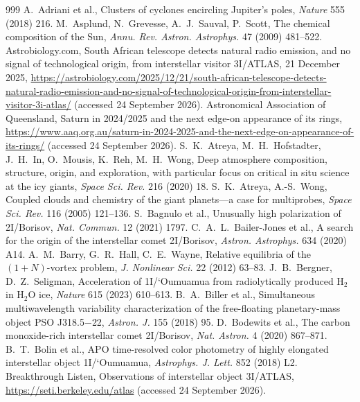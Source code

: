 \documentclass[11pt]{article}
\theoremstyle{definition}\newtheorem{definition}[theorem]{Definition}
\theoremstyle{remark}\newtheorem{remark}[theorem]{Remark}
\begin{document}
\begin{thebibliography}{999}\small\setlength{\itemsep}{0pt}\setlength{\parskip}{0pt}
 A.~Adriani et al., Clusters of cyclones encircling Jupiter's poles, \emph{Nature} 555 (2018) 216.
 M.~Asplund, N.~Grevesse, A.~J.~Sauval, P.~Scott, The chemical composition of the Sun, \emph{Annu. Rev. Astron. Astrophys.} 47 (2009) 481--522.
 Astrobiology.com, South African telescope detects natural radio emission, and no signal of technological origin, from interstellar visitor 3I/ATLAS, 21 December 2025, \url{https://astrobiology.com/2025/12/21/south-african-telescope-detects-natural-radio-emission-and-no-signal-of-technological-origin-from-interstellar-visitor-3i-atlas/} (accessed 24 September 2026).
 Astronomical Association of Queensland, Saturn in 2024/2025 and the next edge-on appearance of its rings, \url{https://www.aaq.org.au/saturn-in-2024-2025-and-the-next-edge-on-appearance-of-its-rings/} (accessed 24 September 2026).
 S.~K.~Atreya, M.~H.~Hofstadter, J.~H.~In, O.~Mousis, K.~Reh, M.~H.~Wong, Deep atmosphere composition, structure, origin, and exploration, with particular focus on critical in situ science at the icy giants, \emph{Space Sci. Rev.} 216 (2020) 18.
 S.~K.~Atreya, A.-S.~Wong, Coupled clouds and chemistry of the giant planets---a case for multiprobes, \emph{Space Sci. Rev.} 116 (2005) 121--136.
 S.~Bagnulo et al., Unusually high polarization of 2I/Borisov, \emph{Nat. Commun.} 12 (2021) 1797.
 C.~A.~L.~Bailer-Jones et al., A search for the origin of the interstellar comet 2I/Borisov, \emph{Astron. Astrophys.} 634 (2020) A14.
 A.~M.~Barry, G.~R.~Hall, C.~E.~Wayne, Relative equilibria of the $(1+N)$-vortex problem, \emph{J. Nonlinear Sci.} 22 (2012) 63--83.
 J.~B.~Bergner, D.~Z.~Seligman, Acceleration of 1I/\textquoteleft Oumuamua from radiolytically produced H$_2$ in H$_2$O ice, \emph{Nature} 615 (2023) 610--613.
 B.~A.~Biller et al., Simultaneous multiwavelength variability characterization of the free-floating planetary-mass object PSO J318.5$-$22, \emph{Astron. J.} 155 (2018) 95.
 D.~Bodewits et al., The carbon monoxide-rich interstellar comet 2I/Borisov, \emph{Nat. Astron.} 4 (2020) 867--871.
 B.~T.~Bolin et al., APO time-resolved color photometry of highly elongated interstellar object 1I/\textquoteleft Oumuamua, \emph{Astrophys. J. Lett.} 852 (2018) L2.
 Breakthrough Listen, Observations of interstellar object 3I/ATLAS, \url{https://seti.berkeley.edu/atlas} (accessed 24 September 2026).

\end{thebibliography}
\end{document}
